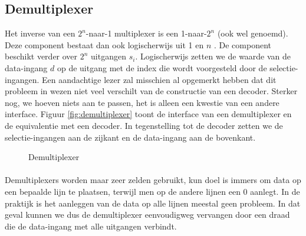 \subsection{Demultiplexer}
Het inverse van een $2^n$-naar-1 multiplexer is een 1-naar-$2^n$  (ook wel  genoemd). Deze component bestaat dan ook logischerwijs uit 1  en $n$ . De component beschikt verder over $2^n$ uitgangen $s_i$. Logischerwijs zetten we de waarde van de data-ingang $d$ op de uitgang met de index die wordt voorgesteld door de selectie-ingangen. Een aandachtige lezer zal misschien al opgemerkt hebben dat dit probleem in wezen niet veel verschilt van de constructie van een decoder. Sterker nog, we hoeven niets aan te passen, het is alleen een kwestie van een andere interface. Figuur \ref{fig:demultiplexer} toont de interface van een demultiplexer en de equivalentie met een decoder. In tegenstelling tot de decoder zetten we de selectie-ingangen aan de zijkant en de data-ingang aan de bovenkant.
\begin{figure}[hbt]
\centering
{}
\caption{Demultiplexer}
\end{figure}
\paragraph{}
Demultiplexers worden maar zeer zelden gebruikt, kun doel is immers om data op een bepaalde lijn te plaatsen, terwijl men op de andere lijnen een 0 aanlegt. In de praktijk is het aanleggen van de data op alle lijnen meestal geen probleem. In dat geval kunnen we dus de demultiplexer eenvoudigweg vervangen door een draad die de data-ingang met alle uitgangen verbindt.
